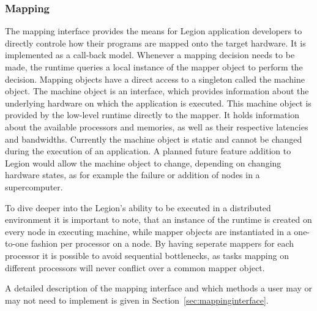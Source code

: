 \documentclass{article}      %
\begin{document}
\subsubsection{Mapping}\label{sec:runtimeMapping}
The mapping interface provides the means for Legion application developers to directly controle how their programs are mapped onto the target hardware. It is implemented as a call-back model. Whenever a mapping decision needs to be made, the runtime queries a local instance of the mapper object to perform the decision.
Mapping objects have a direct access to a singleton called the machine object. The machine object is an interface, which provides information about the underlying hardware on which the application is executed. This machine object is provided by the low-level runtime directly to the mapper. It holds information about the available processors and memories, as well as their respective latencies and bandwidths. Currently the machine object is static and cannot be changed during the execution of an application. A planned future feature addition to Legion would allow the machine object to change, depending on changing hardware states, as for example the failure or addition of nodes in a supercomputer.

To dive deeper into the Legion's ability to be executed in a distributed environment it is important to note, that an instance of the runtime is created on every node in executing machine, while mapper objects are instantiated in a one-to-one fashion per processor on a node. By having seperate mappers for each processor it is possible to avoid sequential bottlenecks, as tasks mapping on different processors will never conflict over a common mapper object.

A detailed description of the mapping interface and which methods a user may or may not need to implement is given in Section~\ref{sec:mappinginterface}.
\end{document}
